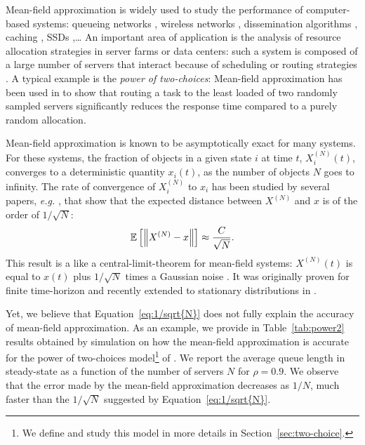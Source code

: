 \documentclass[sigconf]{acmart}
\newcommand\XN{X^{(N)}}
\newcommand\esp[1]{{\mathchoice{\besp{#1}}{\sesp{#1}}{\sesp{#1}}{\sesp{#1}}}}
\newcommand\besp[1]{\mathbb{E}\left[#1\right]}
\newcommand\sesp[1]{\mathbb{E}[#1]}
\newcommand\norm[1]{{\mathchoice{\bnorm{#1}}{\snorm{#1}}{\snorm{#1}}{\snorm{#1}}}}
\newcommand\bnorm[1]{\left\|#1\right\|}
\newcommand\snorm[1]{\|#1\|}
\begin{document}
Mean-field approximation is widely used to study the performance of
computer-based systems: queueing networks \cite{baccelli1992mean},
wireless networks \cite{cecchi2015mean}, dissemination algorithms
\cite{chaintreau2009age}, caching \cite{gast2015transient}, SSDs
\cite{van2013mean},\dots{} An important area of application is the
analysis of resource allocation strategies in server farms or data
centers: such a system is composed of a large number of servers that
interact because of scheduling or routing strategies
\cite{gast2010mean,lu2011join,mitzenmacher1996power,tsitsiklis2011power,vvedenskaya1996queueing,minnebo2014fair}.
A typical example is the \emph{power of two-choices}: Mean-field
approximation has been used in
\cite{mitzenmacher1996power,vvedenskaya1996queueing} to show that
routing a task to the least loaded of two randomly sampled servers
significantly reduces the response time compared to a purely random
allocation.

Mean-field approximation is known to be asymptotically exact for many
systems. For these systems, the fraction of objects in a given state
$i$ at time $t$, $\XN_i(t)$, converges to a deterministic quantity
$x_i(t)$, as the number of objects $N$ goes to infinity.  The rate of
convergence of $\XN_i$ to $x_i$ has been studied by several papers,
\emph{e.g.}  \cite{benaim2008class,kurtz70,ying2016rate}, that show
that the expected distance between $\XN$ and $x$ is of the order of
$1/\sqrt{N}$:
\begin{align}
  \label{eq:1/sqrt{N}}
  \esp{\norm{\XN-x}} \approx \frac{C}{\sqrt{N}}.
\end{align}
This result is a like a central-limit-theorem for mean-field systems:
$\XN(t)$ is equal to $x(t)$ plus $1/\sqrt{N}$ times a Gaussian noise
\cite{kurtz70}. It was originally proven for finite time-horizon and
recently extended to stationary distributions in \cite{ying2016rate}.


Yet, we believe that Equation~\eqref{eq:1/sqrt{N}} does not fully
explain the accuracy of mean-field approximation. As an example, we
provide in Table~\ref{tab:power2} results obtained by simulation on
how the mean-field approximation is accurate for the power of
two-choices model\footnote{We define and study this model in more
  details in Section~\ref{sec:two-choice}.} of
\cite{mitzenmacher1996power,vvedenskaya1996queueing}. We report the
average queue length in steady-state as a function of the number of
servers $N$ for $\rho=0.9$. We observe that the error made by the
mean-field approximation decreases as $1/N$, much faster than the
$1/\sqrt{N}$ suggested by Equation~\eqref{eq:1/sqrt{N}}.
\end{document}
